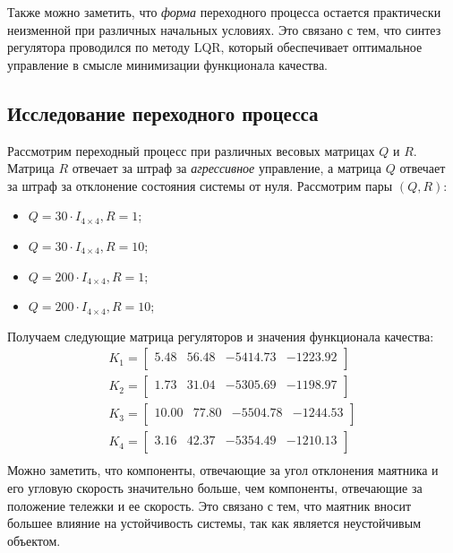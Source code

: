 Также можно заметить, что \textit{форма} переходного процесса остается практически неизменной при различных начальных условиях.
Это связано с тем, что синтез регулятора проводился по методу LQR, который обеспечивает оптимальное
управление в смысле минимизации функционала качества. 

\FloatBarrier
\subsection{Исследование переходного процесса}
Рассмотрим переходный процесс при различных весовых матрицах $Q$ и $R$. Матрица $R$ отвечает за 
штраф за \textit{агрессивное} управление, а матрица $Q$ отвечает за штраф за отклонение состояния системы от нуля.
Рассмотрим пары $(Q, R)$:
\begin{itemize}
    \item $Q = 30 \cdot I_{4\times 4}, R = 1$;
    \item $Q = 30 \cdot I_{4\times 4}, R = 10$;
    \item $Q = 200 \cdot I_{4\times 4}, R = 1$;
    \item $Q = 200 \cdot I_{4\times 4}, R = 10$;
\end{itemize}
Получаем следующие матрица регуляторов и значения функционала качества:
\begin{equation}
    \begin{array}{cccc}
        K_1 = \begin{bmatrix}
        5.48  & 56.48  & -5414.73  & -1223.92 \\ 
        \end{bmatrix} \\ 
        K_2 = \begin{bmatrix}
        1.73  & 31.04  & -5305.69  & -1198.97 \\ 
        \end{bmatrix} \\ 
        K_3 = \begin{bmatrix}
        10.00  & 77.80  & -5504.78  & -1244.53 \\
        \end{bmatrix} \\ 
        K_4 = \begin{bmatrix}
        3.16  & 42.37  & -5354.49  & -1210.13 \\ 
        \end{bmatrix} \\ 
    \end{array}
\end{equation}
Можно заметить, что компоненты, отвечающие за угол отклонения маятника и его угловую скорость значительно больше, 
чем компоненты, отвечающие за положение тележки и ее скорость. Это связано с тем, что маятник вносит большее 
влияние на устойчивость системы, так как является неустойчивым объектом. 

